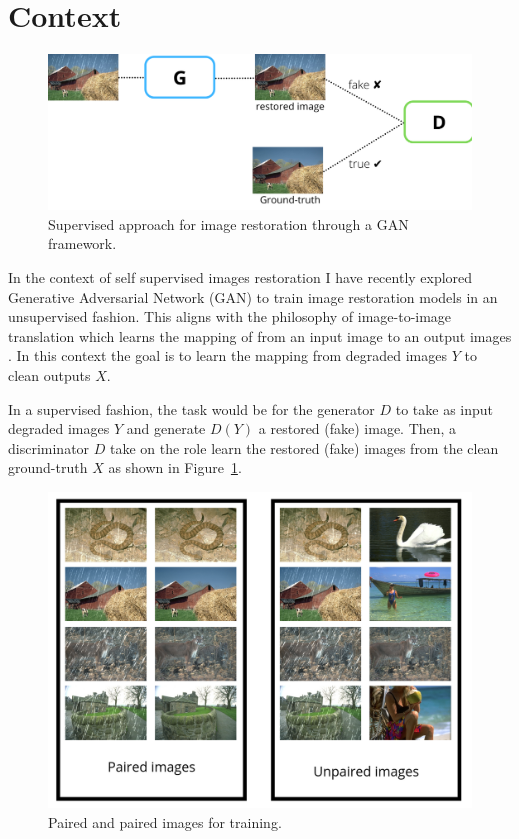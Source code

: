 \section{Context}
\label{sec: Context}
\begin{figure}[h]
    \centering
    \includegraphics[scale=0.23]{./figures/sup_GAN.png}
    \caption{Supervised approach for image restoration through a GAN framework.}
    \label{fig: sup_GAN}
\end{figure}
In the context of self supervised images restoration I have recently explored Generative Adversarial Network (GAN) to train image restoration models in an unsupervised fashion. This aligns with the philosophy of image-to-image translation which learns the mapping of from an input image to an output images \cite{isola2017image}. In this context the goal is to learn the mapping from degraded images $Y$ to clean outputs $X$.
\par In a supervised fashion, the task would be for the generator $D$ to take as input degraded images $Y$ and generate $D(Y)$ a restored (fake) image. Then, a discriminator $D$ take on the role learn the restored (fake) images from the clean ground-truth $X$ as shown in Figure~\ref{fig: sup_GAN}.
\begin{figure}[t!]
    \centering
    \includegraphics[scale=0.2]{./figures/pairs.png}
    \caption{Paired and paired images for training.}
    \label{fig: pairs}
\end{figure}
